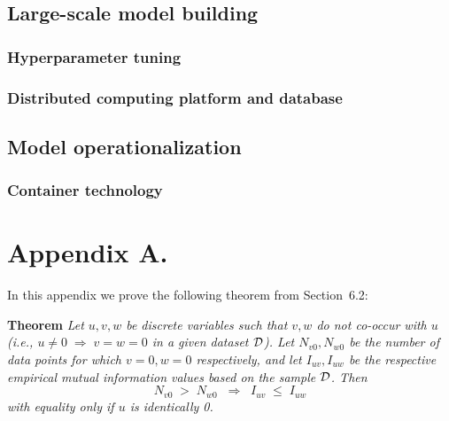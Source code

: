 \documentclass[twoside,11pt]{article}
\newcommand{\dataset}{{\cal D}}
\begin{document}
\begin{enumerate}
\begin{itemize}
\subsection{Large-scale model building}
\subsubsection{Hyperparameter tuning}
\subsubsection{Distributed computing platform and database}
\subsection{Model operationalization}
\subsubsection{Container technology}




\newpage

\appendix
\section*{Appendix A.}
\label{app:theorem}



In this appendix we prove the following theorem from
Section~6.2:

\noindent
{\bf Theorem} {\it Let $u,v,w$ be discrete variables such that $v, w$ do
not co-occur with $u$ (i.e., $u\neq0\;\Rightarrow \;v=w=0$ in a given
dataset $\dataset$). Let $N_{v0},N_{w0}$ be the number of data points for
which $v=0, w=0$ respectively, and let $I_{uv},I_{uw}$ be the
respective empirical mutual information values based on the sample
$\dataset$. Then
\[
	N_{v0} \;>\; N_{w0}\;\;\Rightarrow\;\;I_{uv} \;\leq\;I_{uw}
\]
with equality only if $u$ is identically 0.} \hfill\BlackBox


\end{itemize}
\end{enumerate}
\end{document}
